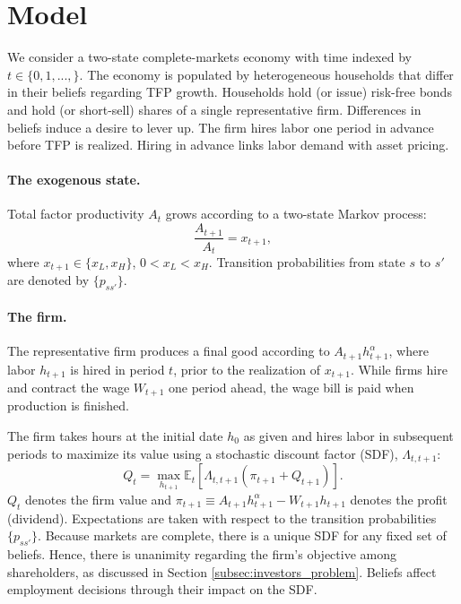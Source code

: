 \section{Model}\label{sec:environment.sec}

 We consider a two-state complete-markets economy with time indexed by $t\in\{0,1,...,\}$. The economy is populated by heterogeneous households that differ in their beliefs regarding TFP growth. Households hold (or issue) risk-free bonds and hold (or short-sell) shares of a single representative firm. Differences in beliefs induce a desire to lever up. 
The firm hires labor one period in advance before TFP is realized. Hiring in advance links labor demand with asset pricing.

\paragraph{The exogenous state.}
Total factor productivity $A_{t}$ grows according to a two-state Markov process:
\begin{equation}
    \frac{A_{t+1}}{A_t} = x_{t+1},
\end{equation}
where $x_{t+1} \in \{x_L, x_H\}$, $0<x_L <x_H $. Transition probabilities from state $s$ to $s'$ are denoted by $\{p_{ss'}\}$. 

\paragraph{The firm.}
The representative firm produces a final good according to $A_{t+1} h_{t+1}^\alpha$, where labor $h_{t+1}$ is hired in period $t$, prior to the realization of $x_{t+1}$. While firms hire and contract the wage $W_{t+1}$ one period ahead, the wage bill is paid when production is finished.

The firm takes hours at the initial date $h_0$ as given and hires labor in subsequent periods to maximize its value using a stochastic discount factor (SDF), $\Lambda_{t,t+1}$: 
\begin{equation} \label{eq: firm_value}
    Q_t =\max_{h_{t+1}}  \mathbb{E}_t\left[ \Lambda_{t,t+1} \left(\pi_{t+1} + Q_{t+1} \right)\right].
\end{equation}
$Q_t$ denotes the firm value and $\pi_{t+1} \equiv A_{t+1} h_{t+1}^\alpha -W_{t+1} h_{t+1}$ denotes the profit (dividend). 
Expectations are taken with respect to the transition probabilities $\{p_{ss'}\}$. 
Because markets are complete, there is a unique SDF for any fixed set of beliefs. 
Hence, there is unanimity regarding the firm's objective among shareholders, as discussed in  Section \ref{subsec:investors_problem}. 
Beliefs affect employment decisions through their impact on the SDF.

